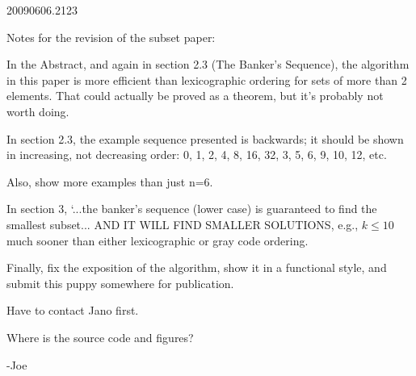 
20090606.2123

Notes for the revision of the subset paper:

In the Abstract, and again in section 2.3 (The Banker's Sequence),
the algorithm in this paper is more efficient than lexicographic
ordering for sets of more than 2 elements.  That could actually
be proved as a theorem, but it's probably not worth doing.

In section 2.3, the example sequence presented is backwards; it
should be shown in increasing, not decreasing order: 0, 1, 2, 4,
8, 16, 32, 3, 5, 6, 9, 10, 12, etc.

Also, show more examples than just n=6.

In section 3, `...the banker's sequence (lower case) is guaranteed
to find the smallest subset... AND IT WILL FIND SMALLER SOLUTIONS,
e.g., $k \le 10$ much sooner than either lexicographic or gray code
ordering.

Finally, fix the exposition of the algorithm, show it in a
functional style, and submit this puppy somewhere for publication.

Have to contact Jano first.

Where is the source code and figures?

-Joe

